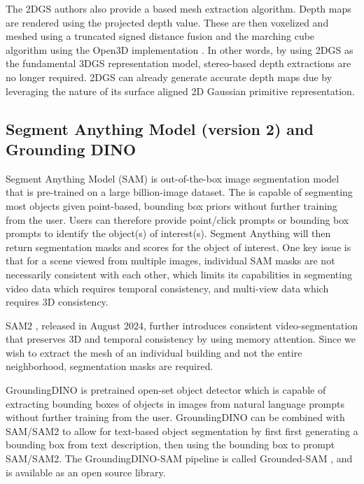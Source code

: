 The 2DGS authors also provide a based mesh extraction algorithm. Depth maps are rendered using the projected depth value. These are then voxelized and meshed using a truncated signed distance fusion and the marching cube algorithm using the Open3D implementation \cite{2018open3d}. In other words, by using 2DGS as the fundamental 3DGS representation model, stereo-based depth extractions are no longer required. 2DGS can already generate accurate depth maps due by leveraging the nature of its surface aligned 2D Gaussian primitive representation.

\subsection{Segment Anything Model (version 2) and Grounding DINO}
Segment Anything Model (SAM) \cite{SAM} is out-of-the-box image segmentation model that is pre-trained on a large billion-image dataset. The is capable of segmenting most objects given point-based, bounding box priors without further training from the user. Users can therefore provide point/click prompts or bounding box prompts to identify the object(s) of interest(s). Segment Anything will then return segmentation masks and scores for the object of interest. One key issue is that for a scene viewed from multiple images, individual SAM masks are not necessarily consistent with each other, which limits its capabilities in segmenting video data which requires temporal consistency, and multi-view data which requires 3D consistency. 

SAM2 \cite{SAM2}, released in August 2024, further introduces consistent video-segmentation that preserves 3D and temporal consistency by using memory attention. Since we wish to extract the mesh of an individual building and not the entire neighborhood, segmentation masks are required. %

GroundingDINO \cite{groundingdino} is pretrained open-set object detector which is capable of extracting bounding boxes of objects in images from natural language prompts without further training from the user. GroundingDINO can be combined with SAM/SAM2 to allow for text-based object segmentation by first first generating a bounding box from text description, then using the bounding box to prompt SAM/SAM2. The GroundingDINO-SAM pipeline is called Grounded-SAM  \cite{groundedsam}, and is available as an open source library.

